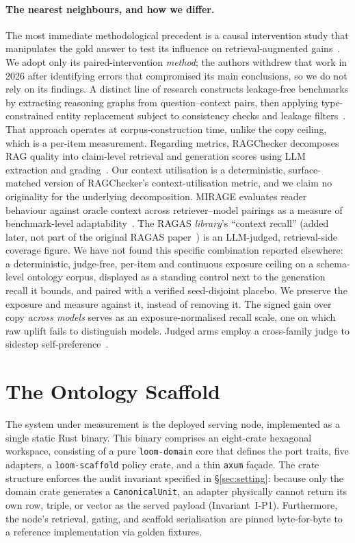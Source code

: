 \documentclass[10pt,twocolumn]{article}
\begin{document}
\paragraph{The nearest neighbours, and how we differ.}
The most immediate methodological precedent is a causal intervention study that manipulates the gold answer to test its influence on retrieval-augmented gains~\cite{answerpresence2026}. We adopt only its paired-intervention \emph{method}; the authors withdrew that work in 2026 after identifying errors that compromised its main conclusions, so we do not rely on its findings. A distinct line of research constructs leakage-free benchmarks by extracting reasoning graphs from question--context pairs, then applying type-constrained entity replacement subject to consistency checks and leakage filters~\cite{seedrg2026}. That approach operates at corpus-construction time, unlike the copy ceiling, which is a per-item measurement. Regarding metrics, RAGChecker decomposes RAG quality into claim-level retrieval and generation scores using LLM extraction and grading~\cite{ragchecker2024}. Our context utilisation is a deterministic, surface-matched version of RAGChecker's context-utilisation metric, and we claim no originality for the underlying decomposition. MIRAGE evaluates reader behaviour against oracle context across retriever--model pairings as a measure of benchmark-level adaptability~\cite{mirage2025}. The RAGAS \emph{library}'s ``context recall'' (added later, not part of the original RAGAS paper~\cite{es2023ragas}) is an LLM-judged, retrieval-side coverage figure. We have not found this specific combination reported elsewhere: a deterministic, judge-free, per-item and continuous exposure ceiling on a schema-level ontology corpus, displayed as a standing control next to the generation recall it bounds, and paired with a verified seed-disjoint placebo. We preserve the exposure and measure against it, instead of removing it. The signed gain over copy \emph{across models} serves as an exposure-normalised recall scale, one on which raw uplift fails to distinguish models. Judged arms employ a cross-family judge to sidestep self-preference~\cite{zheng2023judging,panickssery2024selfpreference}.

\section{The Ontology Scaffold}\label{sec:system}
The system under measurement is the deployed serving node, implemented as a single static Rust binary. This binary comprises an eight-crate hexagonal workspace, consisting of a pure \texttt{loom-domain} core that defines the port traits, five adapters, a \texttt{loom-scaffold} policy crate, and a thin \texttt{axum} façade. The crate structure enforces the audit invariant specified in \S\ref{sec:setting}: because only the domain crate generates a \texttt{CanonicalUnit}, an adapter physically cannot return its own row, triple, or vector as the served payload (Invariant~I-P1). Furthermore, the node's retrieval, gating, and scaffold serialisation are pinned byte-for-byte to a reference implementation via golden fixtures.
\end{document}
